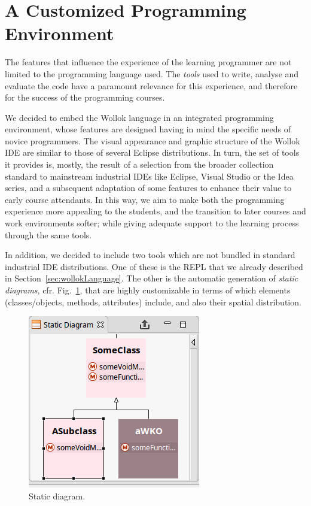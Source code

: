 \section{A Customized Programming Environment}
\label{sec:environment}

The features that influence the experience of the learning programmer are not limited to the programming language used. 
The \emph{tools} used to write, analyse and evaluate the code have a paramount relevance for this experience, and therefore for the success of the programming courses.

We decided to embed the Wollok language in an integrated programming environment, whose features are designed having in mind the specific needs of novice programmers.
The visual appearance and graphic structure of the Wollok IDE are similar to those of several Eclipse distributions. 
In turn, the set of tools it provides is, mostly, the result of a selection from the broader collection standard to mainstream industrial IDEs like Eclipse, Visual Studio or the Idea series, and a subsequent adaptation of some features to enhance their value to early course attendants.
In this way, we aim to make both the programming experience more appealing to the students, and the transition to later courses and work environments softer; while giving adequate support to the learning process through the same tools.

\medskip
In addition, we decided to include two tools which are not bundled in standard industrial IDE distributions. 
One of these is the REPL that we already described in Section~\ref{sec:wollokLanguage}.
The other is the automatic generation of \emph{static diagrams}, cfr. Fig.~\ref{fig:outline}, that are highly customizable in terms of which elements (classes/objects, methods, attributes) include, and also their spatial distribution.

\begin{figure}[ht]
 \centering
 \includegraphics[scale=0.5]{../images/staticDiagram.png}
 \caption{\small Static diagram.}
 \label{fig:outline}
\end{figure}

